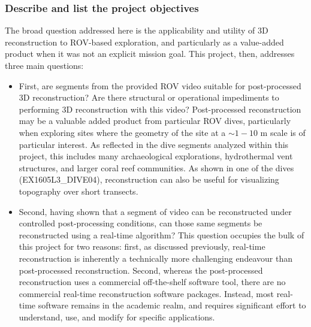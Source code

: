 \documentclass[letterpaper,12pt]{article}
\begin{document}
\subsubsection{Describe and list the project objectives}

The broad question addressed here is the applicability and utility of 3D reconstruction to ROV-based exploration, and particularly as a value-added product when it was not an explicit mission goal.  This project, then, addresses three main questions:

\begin{itemize}
    \item First, are segments from the provided ROV video suitable for post-processed 3D reconstruction?   Are there structural or operational impediments to performing 3D reconstruction with this video?   Post-processed reconstruction may be a valuable added product from particular ROV dives, particularly when exploring sites where the geometry of the site at a $\sim 1-10$ m scale is of particular interest.  As reflected in the dive segments analyzed within this project, this includes many archaeological explorations,  hydrothermal vent structures, and larger coral reef communities.   As shown in one of the dives (EX1605L3\_DIVE04), reconstruction can also be useful for visualizing topography over short transects.
    
    \item Second, having shown that a segment of video can be reconstructed under controlled post-processing conditions, can those same segments be reconstructed using a real-time algorithm?   This question occupies the bulk of this project for two reasons:  first, as discussed previously, real-time reconstruction is inherently a technically more challenging endeavour than post-processed reconstruction.  Second, whereas the post-processed reconstruction uses a commercial off-the-shelf software tool, there are no commercial real-time reconstruction software packages.  Instead, most real-time software remains in the academic realm, and requires significant effort to understand, use, and modify for specific applications.  


\end{itemize}
\end{document}
